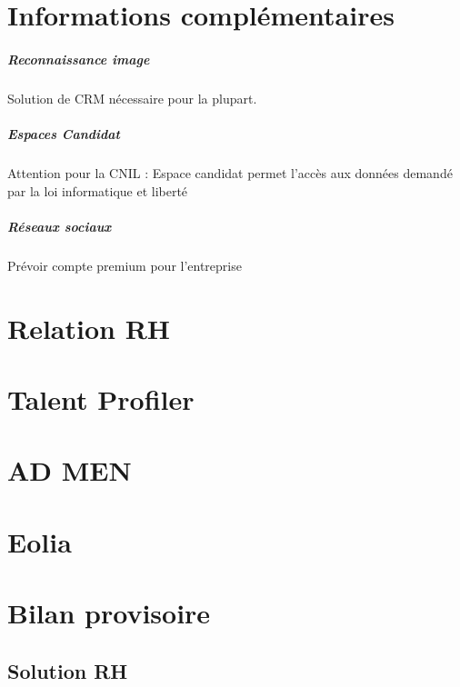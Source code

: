\documentclass[12pt,twoside]{scrreprt}
\date{Avril 2016}
\author{Direction des opérations}
\begin{document}
\initIngeniance


% 

\tableofcontents

\chapter*{Informations complémentaires}
\paragraph{Reconnaissance image} Solution de CRM nécessaire pour la plupart.
\paragraph{Espaces Candidat} Attention pour la CNIL : Espace candidat permet l'accès aux données demandé par la loi informatique et liberté 
\paragraph{Réseaux sociaux} Prévoir compte premium pour l'entreprise

\chapter{Relation RH}


\chapter{Talent Profiler}


\chapter{AD MEN}


\chapter{Eolia}




\chapter{Bilan provisoire}
\section{Solution RH}
\end{document}
